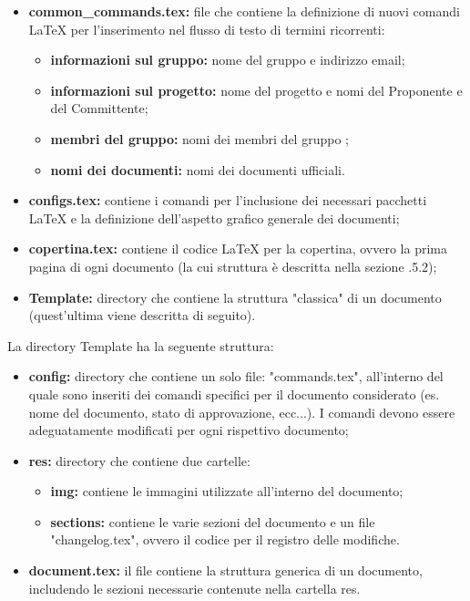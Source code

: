         \begin{itemize}
          \item \textbf{common\_commands.tex:} file che contiene la definizione di nuovi comandi \LaTeX{} per l'inserimento nel flusso di testo di termini ricorrenti:
            \begin{itemize}
              \item \textbf{informazioni sul gruppo:} nome del gruppo e indirizzo email;
              \item \textbf{informazioni sul progetto:} nome del progetto e nomi del Proponente e del Committente;
              \item \textbf{membri del gruppo:} nomi dei membri del gruppo \Gruppo;
              \item \textbf{nomi dei documenti:} nomi dei documenti ufficiali.
            \end{itemize}
          \item \textbf{configs.tex:} contiene i comandi per l'inclusione dei necessari pacchetti \LaTeX{} e la definizione dell'aspetto grafico generale dei documenti;
          \item \textbf{copertina.tex:} contiene il codice \LaTeX{} per la copertina, ovvero la prima pagina di ogni documento (la cui struttura è descritta nella sezione .5.2);
          \item \textbf{Template:} directory che contiene la struttura "classica" di un documento (quest'ultima viene descritta di seguito).
        \end{itemize}
        La directory Template ha la seguente struttura:
        \begin{itemize}
          \item \textbf{config:} directory che contiene un solo file: "commands.tex", all'interno del quale sono inseriti dei comandi specifici per il documento considerato (es. nome del documento, stato di approvazione, ecc...). I comandi devono essere adeguatamente modificati per ogni rispettivo documento;
          \item \textbf{res:} directory che contiene due cartelle:
            \begin{itemize}
              \item \textbf{img:} contiene le immagini utilizzate all'interno del documento;
              \item \textbf{sections:} contiene le varie sezioni del documento e un file "changelog.tex", ovvero il codice per il registro delle modifiche.
            \end{itemize}
          \item \textbf{document.tex:} il file contiene la struttura generica di un documento, includendo le sezioni necessarie contenute nella cartella res.
        \end{itemize}


